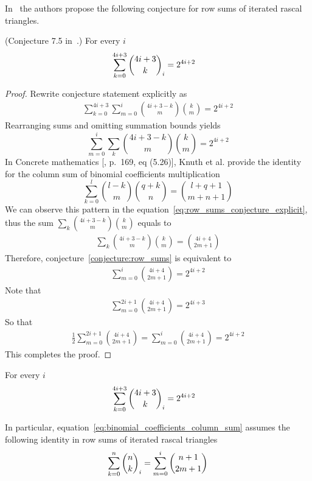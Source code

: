 ﻿In~\cite{gregory2023iterated} the authors
propose the following conjecture for row sums of iterated rascal triangles.
\begin{conj}
    \label{conjecture:row_sums}
    (Conjecture 7.5 in~\cite{gregory2023iterated}.)
    For every $i$
    \begin{align*}
        \sum_{k=0}^{4i+3} \binom{4i+3}{k}_{i} &= 2^{4i+2}
    \end{align*}
\end{conj}
\begin{proof}
    Rewrite conjecture statement explicitly as
    \begin{align*}
        \sum_{k=0}^{4i+3} \sum_{m=0}^{i} \binom{4i+3-k}{m} \binom{k}{m} = 2^{4i+2}
    \end{align*}
    Rearranging sums and omitting summation bounds yields
    \begin{equation}
        \sum_{m=0}^{i}  \sum_{k} \binom{4i+3-k}{m} \binom{k}{m} = 2^{4i+2}\label{eq:row_sums_conjecture_explicit}
    \end{equation}
    In Concrete mathematics [\cite{graham1994concrete}, p.\ 169, eq (5.26)], Knuth et al.
    provide the identity for the column sum of binomial coefficients multiplication
    \begin{equation}
        \label{eq:binomial_coefficients_column_sum}
        \sum_{k=0}^{l} \binom{l-k}{m} \binom{q+k}{n} = \binom{l+q+1}{m+n+1}
    \end{equation}
    We can observe this pattern in the equation~\eqref{eq:row_sums_conjecture_explicit},
    thus the sum $\sum_{k} \binom{4i+3-k}{m} \binom{k}{m}$ equals to
    \begin{align*}
        \sum_{k} \binom{4i+3-k}{m} \binom{k}{m} = \binom{4i+4}{2m+1}
    \end{align*}
    Therefore, conjecture~\eqref{conjecture:row_sums} is equivalent to
    \begin{align*}
        \sum_{m=0}^{i} \binom{4i+4}{2m+1} = 2^{4i+2}
    \end{align*}
    Note that
    \begin{align*}
        \sum_{m=0}^{2i+1} \binom{4i+4}{2m+1} = 2^{4i+3}
    \end{align*}
    So that
    \begin{align*}
        \frac{1}{2} \sum_{m=0}^{2i+1} \binom{4i+4}{2m+1} = \sum_{m=0}^{i} \binom{4i+4}{2m+1} = 2^{4i+2}
    \end{align*}
    This completes the proof.
\end{proof}
\begin{proposition}
    For every $i$
    \begin{align*}
        \sum_{k=0}^{4i+3} \binom{4i+3}{k}_{i} &= 2^{4i+2}
    \end{align*}
\end{proposition}
In particular, equation~\eqref{eq:binomial_coefficients_column_sum} assumes the following identity in
row sums of iterated rascal triangles
\begin{align*}
    \sum\limits_{k=0}^n \binom{n}{k}_{i} = \sum_{m=0}^{i} \binom{n+1}{2m+1}
\end{align*}
